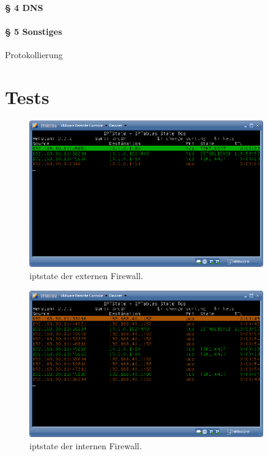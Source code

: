 
\paragraph{§ 4 DNS}


\paragraph{§ 5 Sonstiges}


Protokollierung


\section{Tests}\label{sec.tests}

\begin{figure}[h!]
  \centering
    \includegraphics[width=0.9\textwidth]{figures/iptstate-extern.png}
  \caption{iptstate der externen Firewall.}
  \label{fig.iptstate-extern}
\end{figure}

\begin{figure}[h!]
  \centering
    \includegraphics[width=0.9\textwidth]{figures/iptstate-intern.png}
  \caption{iptstate der internen Firewall.}
  \label{fig.iptstate-intern}
\end{figure}


